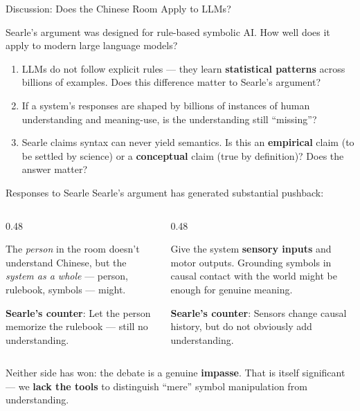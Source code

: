 \documentclass[aspectratio=169,11pt]{beamer}
\begin{document}
\begin{frame}{Discussion: Does the Chinese Room Apply to LLMs?}
\begin{discussionbox}[Discussion]
\small
Searle's argument was designed for rule-based symbolic AI. How well does it apply to modern large language models?
\begin{enumerate}
    \item LLMs do not follow explicit rules --- they learn \textbf{statistical patterns} across billions of examples. Does this difference matter to Searle's argument?
    \item If a system's responses are shaped by billions of instances of human understanding and meaning-use, is the understanding still ``missing''?
    \item Searle claims syntax can never yield semantics. Is this an \textbf{empirical} claim (to be settled by science) or a \textbf{conceptual} claim (true by definition)? Does the answer matter?
\end{enumerate}
\end{discussionbox}
\end{frame}

\begin{frame}[shrink=8]{Responses to Searle}
Searle's argument has generated substantial pushback:

\begin{columns}[T]
\begin{column}{0.48\textwidth}
\begin{probox}
\small
The \emph{person} in the room doesn't understand Chinese, but the \emph{system as a whole} --- person, rulebook, symbols --- might.

\textbf{Searle's counter}: Let the person memorize the rulebook --- still no understanding.
\end{probox}
\end{column}
\begin{column}{0.48\textwidth}
\begin{probox}
\small
Give the system \textbf{sensory inputs} and motor outputs. Grounding symbols in causal contact with the world might be enough for genuine meaning.

\textbf{Searle's counter}: Sensors change causal history, but do not obviously add understanding.
\end{probox}
\end{column}
\end{columns}

\begin{objectionbox}
\small
Neither side has won: the debate is a genuine \textbf{impasse}. That is itself significant --- we \textbf{lack the tools} to distinguish ``mere'' symbol manipulation from understanding.
\end{objectionbox}
\end{frame}
\end{document}

